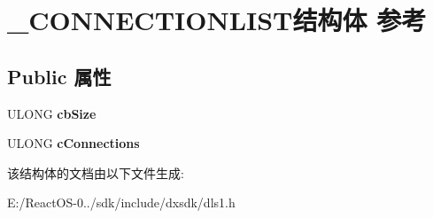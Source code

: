 \hypertarget{struct___c_o_n_n_e_c_t_i_o_n_l_i_s_t}{}\section{\+\_\+\+C\+O\+N\+N\+E\+C\+T\+I\+O\+N\+L\+I\+S\+T结构体 参考}
\label{struct___c_o_n_n_e_c_t_i_o_n_l_i_s_t}
\subsection*{Public 属性}
\begin{DoxyCompactItemize}
\item 
\mbox{\label{struct___c_o_n_n_e_c_t_i_o_n_l_i_s_t_a574e48c0c26f7607f69bed78fce80cbf}} 
U\+L\+O\+NG {\bfseries cb\+Size}
\item 
\mbox{\label{struct___c_o_n_n_e_c_t_i_o_n_l_i_s_t_a52d9cd07c2fcd8d839d90dab6937f159}} 
U\+L\+O\+NG {\bfseries c\+Connections}
\end{DoxyCompactItemize}


该结构体的文档由以下文件生成\+:\begin{DoxyCompactItemize}
\item 
E\+:/\+React\+O\+S-\/0../sdk/include/dxsdk/dls1.\+h\end{DoxyCompactItemize}
